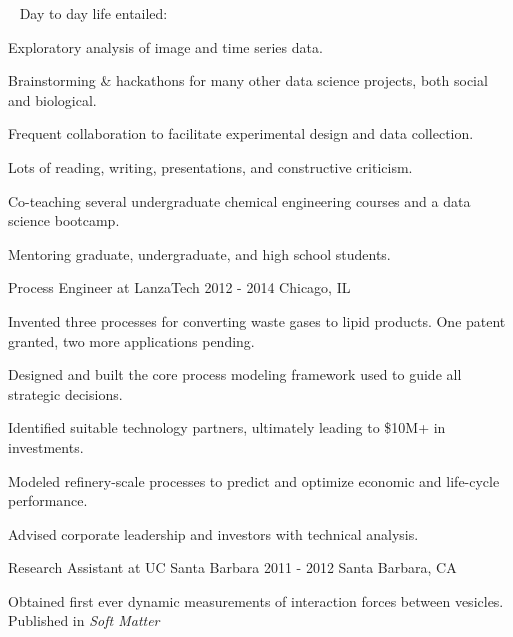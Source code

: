 \begin{cventries}
{%
    \ \newline 
    Day to day life entailed:
    \vspace{4.0mm}
    \begin{cvitems}
		 \item {Exploratory analysis of image and time series data.}
		 \item {Brainstorming \& hackathons for many other data science projects, both social and biological.}
		 \item {Frequent collaboration to facilitate experimental design and data collection.}
		 \item {Lots of reading, writing, presentations, and constructive criticism.}          
         \item {Co-teaching several undergraduate chemical engineering courses and a data science bootcamp.}
         \item {Mentoring graduate, undergraduate, and high school students.}         
      \end{cvitems}
     }
      
  \cventrynew
    {Process Engineer at LanzaTech} 
    {2012 - 2014} 
    {Chicago, IL} 
    {
      \begin{cvitems} %
        \item {Invented three processes for converting waste gases to lipid products. One patent granted, two more applications pending.}
		\item {Designed and built the core process modeling framework used to guide all strategic decisions.}        
		\item {Identified suitable technology partners, ultimately leading to \$10M+ in investments.}
        \item {Modeled refinery-scale processes to predict and optimize economic and life-cycle performance.}        
        \item {Advised corporate leadership and investors with technical analysis.}
      \end{cvitems}
    }
    
  \cventryshort
    {Research Assistant at UC Santa Barbara}
    {2011 - 2012}
    {Santa Barbara, CA}         
    {
      \begin{cvitems} %
        \item {Obtained first ever dynamic measurements of interaction forces between vesicles. Published in \emph{Soft Matter}}        
      \end{cvitems}
    }   
  

\end{cventries}

